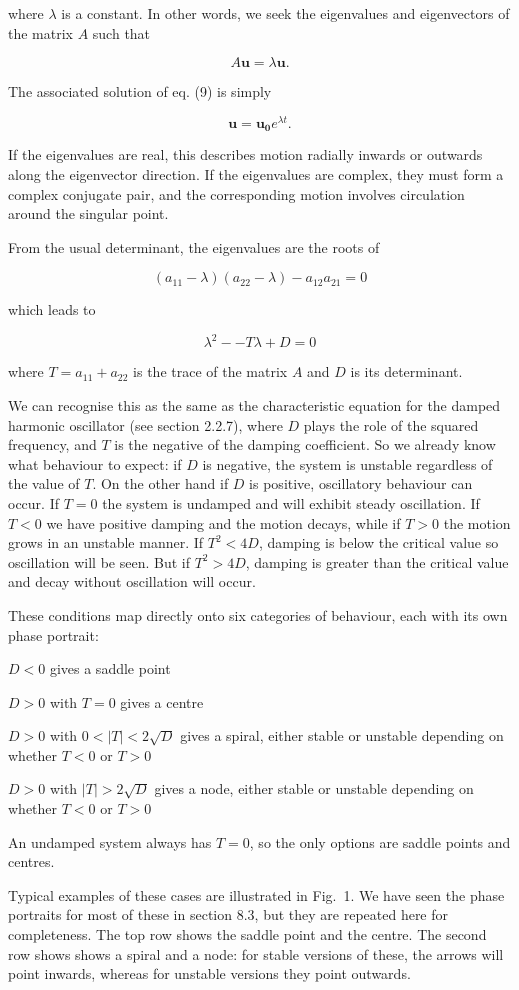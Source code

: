   where $\lambda$ is a constant. In other words, we seek the eigenvalues and 
  eigenvectors of the matrix $A$ such that 

  $$A \mathbf{u} = \lambda \mathbf{u} . \tag{10}$$ 

  The associated solution of eq. (9) is simply 

  $$\mathbf{u} = \mathbf{u_0} e^{\lambda t} . \tag{11}$$ 

  If the eigenvalues are real, this describes motion radially inwards or 
  outwards along the eigenvector direction. If the eigenvalues are complex, 
  they must form a complex conjugate pair, and the corresponding motion 
  involves circulation around the singular point. 

  From the usual determinant, the eigenvalues are the roots of 

  $$(a_{11}-\lambda)(a_{22}-\lambda)-a_{12} a_{21} =0 \tag{12}$$ 

  which leads to 

  $$\lambda^2 -- T \lambda +D =0 \tag{13}$$ 

  where $T=a_{11}+a_{22}$ is the trace of the matrix $A$ and $D$ is its 
  determinant. 

  We can recognise this as the same as the characteristic equation for the 
  damped harmonic oscillator (see section 2.2.7), where $D$ plays the role of 
  the squared frequency, and $T$ is the negative of the damping coefficient. So 
  we already know what behaviour to expect: if $D$ is negative, the system is 
  unstable regardless of the value of $T$. On the other hand if $D$ is 
  positive, oscillatory behaviour can occur. If $T=0$ the system is undamped 
  and will exhibit steady oscillation. If $T<0$ we have positive damping and 
  the motion decays, while if $T>0$ the motion grows in an unstable manner. If 
  $T^2 < 4D$, damping is below the critical value so oscillation will be seen. 
  But if $T^2 > 4D$, damping is greater than the critical value and decay 
  without oscillation will occur. 

  These conditions map directly onto six categories of behaviour, each with its 
  own phase portrait: 

  $D<0$ gives a saddle point 

  $D>0$ with $T=0$ gives a centre 

  $D>0$ with $0 < |T| < 2\sqrt{D}$ gives a spiral, either stable or unstable 
  depending on whether $T<0$ or $T>0$ 

  $D>0$ with $|T| > 2\sqrt{D}$ gives a node, either stable or unstable 
  depending on whether $T<0$ or $T>0$ 

  An undamped system always has $T=0$, so the only options are saddle points 
  and centres. 

  Typical examples of these cases are illustrated in Fig.\ 1. We have seen the 
  phase portraits for most of these in section 8.3, but they are repeated here 
  for completeness. The top row shows the saddle point and the centre. The 
  second row shows shows a spiral and a node: for stable versions of these, the 
  arrows will point inwards, whereas for unstable versions they point outwards. 
